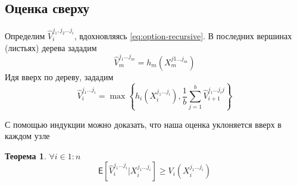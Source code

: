 \documentclass[a4paper,10pt]{article}
\newtheorem{theorem}{Теорема}
\begin{document}
\subsection{Оценка сверху}
\par Определим $\hat{V}_i^{j_1, j_2 \ldots j_i}$, вдохновляясь \ref{eq:option-recursive}. В последних вершинах (листьях) дерева зададим
\begin{equation}\label{eq:upper-terminal}
	\hat{V}_m^{j_1 \ldots j_m} = h_m\left(X_m^{j1 \ldots j_m}\right)
\end{equation}
Идя вверх по дереву, зададим
\begin{equation}\label{eq:upper-node}
	\hat{V}_i^{j_1 \ldots j_i} = \max \left\lbrace h_i \left( X_i^{j_1 \ldots j_i} \right), \frac{1}{b} \sum_{j = 1}^b \hat{V}_{i+1}^{j_1 \ldots j_i j}\right\rbrace 
\end{equation}
\par С помощью индукции можно доказать, что наша оценка уклоняется вверх в каждом узле
\begin{theorem}
	$\forall i \in 1:n$
	\begin{equation*}
	\mathsf{E}\left[\hat{V}_i^{j_1\ldots j_i}|X_i^{j_1\ldots j_i}\right] \geqslant V_i\left(X_i^{j_1\ldots j_i}\right)
	\end{equation*}
\end{theorem}
\end{document}
